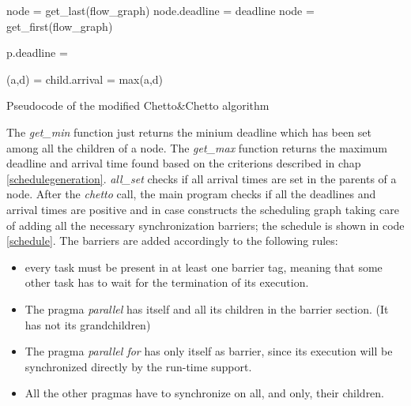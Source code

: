 \documentclass[a4paper,11pt,oneside]{book}
\begin{document}
\begin{algorithm}[H]
\begin{algorithmic}
\State node = get\_last(flow\_graph)
\State node.deadline = deadline
\State {}
\State node = get\_first(flow\_graph)
\State {}
\EndFunction

\end{algorithmic}

\begin{algorithmic}
\State p.deadline =  
\EndFor
{}
\State {}
\EndFor
\EndIf
\EndFunction

\end{algorithmic}

\begin{algorithmic}
\State (a,d) =  
\State child.arrival = max(a,d)
\EndIf
\State {}
\EndFor
\EndIf
\EndFunction

\end{algorithmic}
\caption{Pseudocode of the modified Chetto\&Chetto algorithm }
\end{algorithm}

The \emph{get\_min} function just returns the minium deadline which has been set among all the children of a node. The \emph{get\_max} function returns the maximum deadline and arrival time found based on the criterions described in chap \ref{schedulegeneration}. \emph{all\_set} checks if all arrival times are set in the parents of a node.
After the \emph{chetto} call, the main program checks if all the deadlines and arrival times are positive and in case constructs the scheduling graph taking care of adding all the necessary synchronization barriers; the schedule is shown in code \ref{schedule}. The barriers are added accordingly to the following rules:
\begin{itemize}
\item {every task must be present in at least one barrier tag, meaning that some other task has to wait for the termination of its execution.}
\item {The pragma \emph{parallel} has itself and all its children in the barrier section. (It has not its grandchildren)}
\item {The pragma \emph{parallel for} has only itself as barrier, since its execution will be synchronized directly by the run-time support.}
\item {All the other pragmas have to synchronize on all, and only, their children.}

\end{itemize}
\end{document}
